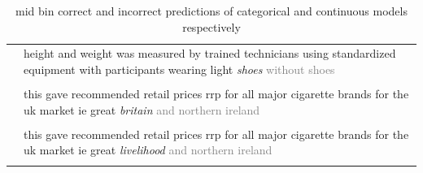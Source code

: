 \documentclass[11pt,a4paper]{article}
\begin{document}
\begin{table}[t]
\begin{tabularx}{\linewidth}{ll}
    \addlinespace[1ex]
    {\tt G} & \multirow{1}{*}{\parbox{13cm}{height and weight was measured by trained technicians using standardized equipment with participants wearing light \textit{shoes} \textcolor{gray}{without shoes}}} \\ \\
    \addlinespace[1ex]
    {\tt ctg} & \multirow{1}{*}{\parbox{13cm}{this gave recommended retail prices rrp for all major cigarette brands for the uk market ie great \textit{britain} \textcolor{gray}{and northern ireland}}} \\ \\
    \addlinespace[1ex]
    {\tt G} & \multirow{1}{*}{\parbox{13cm}{this gave recommended retail prices rrp for all major cigarette brands for the uk market ie great \textit{livelihood} \textcolor{gray}{and northern ireland}}} \\ \\
\end{tabularx}
  \caption{mid bin correct and incorrect predictions of categorical and continuous models respectively}
  \label{tab:catgeorical}
\end{table}


\end{document}
